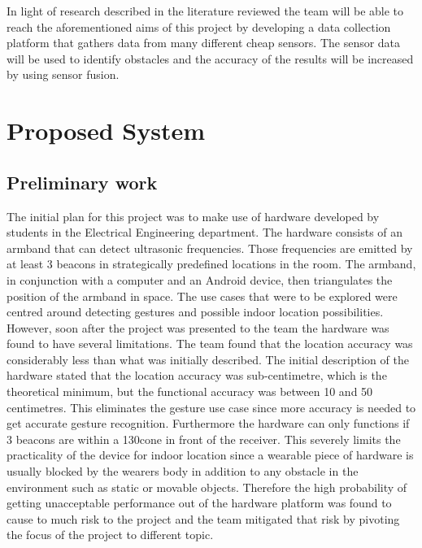 \documentclass[prodmode,acmtosem]{acmsmall} %
\begin{document}
In light of research described in the literature reviewed the team will be able to reach the aforementioned aims of this project by developing a data collection platform that gathers data from many different cheap sensors. The sensor data will be used to identify obstacles and the accuracy of the results will be increased by using sensor fusion.



\section{Proposed System}
\subsection{Preliminary work}
\label{sec:Prelim}



The initial plan for this project was to make use of hardware developed by students in the Electrical Engineering department. The hardware consists of an armband that can detect ultrasonic frequencies. Those frequencies are emitted by at least 3 beacons in strategically predefined locations in the room. The armband, in conjunction with a computer and an Android device, then triangulates the position of the armband in space.
The use cases that were to be explored were centred around detecting gestures and possible indoor location possibilities. However, soon after the project was presented to the team the hardware was found to have several limitations. The team found that the location accuracy was considerably less than what was initially described. The initial description of the hardware stated that the location accuracy was sub-centimetre, which is the theoretical minimum, but the functional accuracy was between 10 and 50 centimetres. This eliminates the gesture use case since more accuracy is needed to get accurate gesture recognition.
Furthermore the hardware can only functions if 3 beacons are within a 130\degree cone in front of the receiver. This severely limits the practicality of the device for indoor location since a wearable piece of hardware is usually blocked by the wearers body in addition to any obstacle in the environment such as static or movable objects.
Therefore the high probability of getting unacceptable performance out of the hardware platform was found to cause to much risk to the project and the team mitigated that risk by pivoting the focus of the project to different topic.
\end{document}
